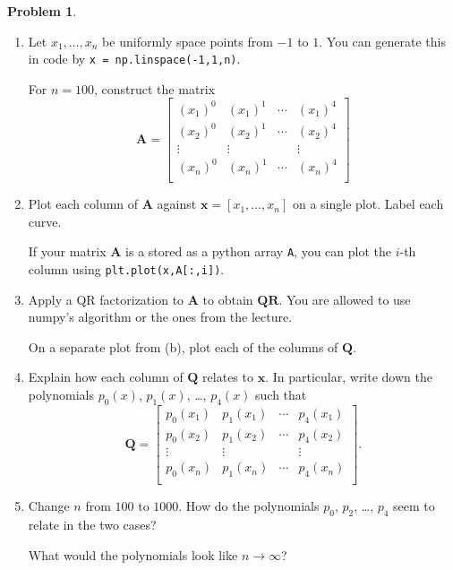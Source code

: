 \documentclass[12pt]{article}
\theoremstyle{definition}
\newtheorem{problem}{Problem}
\renewcommand{\vec}{\mathbf}
\begin{document}
\begin{problem}
\begin{enumerate}
        \item
            Let $x_1, \ldots, x_n$ be uniformly space points from $-1$ to $1$.
            You can generate this in code by \lstinline{x = np.linspace(-1,1,n)}.

            For $n=100$, construct the matrix
            \[
                \vec{A} = 
                \begin{bmatrix}
                    (x_1)^0 & (x_1)^1 & \cdots & (x_1)^4 \\
                    (x_2)^0 & (x_2)^1 & \cdots & (x_2)^4 \\ 
                    \vdots & \vdots & & \vdots \\
                    (x_n)^0 & (x_n)^1 & \cdots & (x_n)^4 \\
                \end{bmatrix}
            \]
        \item 
            Plot each column of $\vec{A}$ against $\vec{x} = [x_1, \ldots, x_n]$ on a single plot. 
            Label each curve. 
            
            If your matrix $\vec{A}$ is a stored as a python array \lstinline{A}, you can plot the $i$-th column using \lstinline{plt.plot(x,A[:,i])}.

        \item Apply a QR factorization to $\vec{A}$ to obtain $\vec{Q}\vec{R}$. You are allowed to use numpy's algorithm or the ones from the lecture.

            On a separate plot from (b), plot each of the columns of $\vec{Q}$.

        \item 
            Explain how each column of $\vec{Q}$ relates to $\vec{x}$.
            In particular, write down the polynomials $p_0(x)$, $p_1(x)$, \ldots, $p_4(x)$ such that 
            \[
                \vec{Q} = 
                \begin{bmatrix}
                    p_0(x_1) & p_1(x_1) & \cdots & p_4(x_1) \\
                    p_0(x_2) & p_1(x_2) & \cdots & p_4(x_2) \\ 
                    \vdots & \vdots & & \vdots \\
                    p_0(x_n) & p_1(x_n) & \cdots & p_4(x_n) \\
                \end{bmatrix}.
            \]
        \item Change $n$ from $100$ to $1000$. 
            How do the polynomials $p_0$, $p_2$, \ldots, $p_4$ seem to relate in the two cases?
            
            What would the polynomials look like $n\to\infty$?
    \end{enumerate}

\end{problem}
\end{document}
